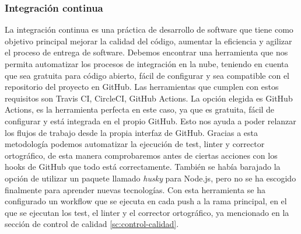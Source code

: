 \subsubsection*{Integración continua}
La integración continua es una práctica de desarrollo de software que tiene como objetivo principal mejorar la calidad del código, aumentar la eficiencia y agilizar el proceso de entrega de software.
Debemos encontrar una herramienta que nos permita automatizar los procesos de integración en la nube, teniendo en cuenta que sea gratuita para código abierto, fácil de configurar y sea compatible con el repositorio del proyecto en GitHub.
Las herramientas que cumplen con estos requisitos son Travis CI, CircleCI, GitHub Actions. La opción elegida es GitHub Actions, es la herramienta perfecta en este caso, ya que es gratuita, fácil de configurar y está integrada en el propio GitHub.
Esto nos ayuda a poder relanzar los flujos de trabajo desde la propia interfaz de GitHub.
Gracias a esta metodología podemos automatizar la ejecución de test, linter y corrector ortográfico, de esta manera comprobaremos antes de ciertas acciones con los hooks de GitHub que todo está
correctamente. También se había barajado la opción de utilizar un paquete llamado \textit{husky} para Node.js, pero no se ha escogido finalmente para aprender nuevas tecnologías.
Con esta herramienta se ha configurado un workflow que se ejecuta en cada push a la rama principal, en el que se ejecutan los test, el linter y el corrector ortográfico, ya mencionado en la sección de control de calidad \ref{sc:control-calidad}.
